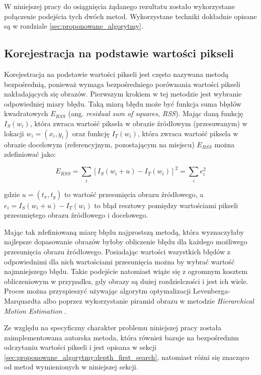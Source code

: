 W niniejszej pracy do osiągnięcia żądanego rezultatu zostało wykorzystane połączenie podejścia tych dwóch metod. Wykorzystane techniki dokładnie opisane są w rozdziale \ref{sec:proponowane_algorytmy}.

\subsection{Korejestracja na podstawie wartości pikseli}
\label{sec:algorytmy_korejestracji:korejestracja_na_podstawie_wartosci}

Korejestracja na podstawie wartości pikseli jest często nazywana metodą bezpośrednią, ponieważ wymaga bezpośredniego porównania wartości pikseli nakładających się obrazów. Pierwszym krokiem w tej metodzie jest wybranie odpowiedniej miary błędu. Taką miarą błędu może być funkcja suma błędów kwadratowych $E_{RSS}$ (ang. \textit{residual sum of squares, RSS}). Mając daną funkcję $I_{S}(w_{i})$, która zwraca wartość piksela w obrazie źródłowym (przesuwanym) w lokacji $w_{i}=(x_{i}, y_{i})$ oraz funkcję $I_{T}(w_{i})$, która zwraca wartość piksela w obrazie docelowym (referencyjnym, pozostającym na miejscu) $E_{RSS}$ można zdefiniować jako:

\begin{equation}
E_{RSS}=\sum_{i}[I_{S}(w_{i}+u)-I_{T}(w_{i})]^2=\sum_{i}e_{i}^2
\end{equation}

gdzie $u=(t_{x}, t_{y})$ to wartość przesunięcia obrazu źródłowego, a $e_{i}=I_{S}(w_{i}+u)-I_{T}(w_{i})$ to błąd resztowy pomiędzy wartościami pikseli przesuniętego obrazu źródłowego i docelowego.

Mając tak zdefiniowaną miarę błędu najprostszą metodą, która wyznaczyłaby najlepsze dopasowanie obrazów byłoby obliczenie błędu dla każdego możliwego przesunięcia obrazu źródłowego. Posiadając wartości wszystkich błędów z odpowiednimi dla nich wartościami przesunięcia można by wybrać wartość najmniejszego błędu. Takie podejście natomiast wiąże się z ogromnym kosztem obliczeniowym w przypadku, gdy obrazy są dużej rozdzielczości i jest ich wiele. Proces można przyspieszyć używając algorytm optymalizacji Levenberga-Marquardta \cite{unser:07} albo poprzez wykorzystanie piramid obrazu w metodzie \textit{Hierarchical Motion Estimation} \cite{export:70092}.

Ze względu na specyficzny charakter problemu niniejszej pracy została zaimplementowana autorska metoda, która również bazuje na bezpośrednim odczytaniu wartości pikseli i jest opisana w sekcji \ref{sec:proponowane_algorytmy:depth_first_search}, natomiast różni się znacząco od metod wymienionych w niniejszej sekcji.

